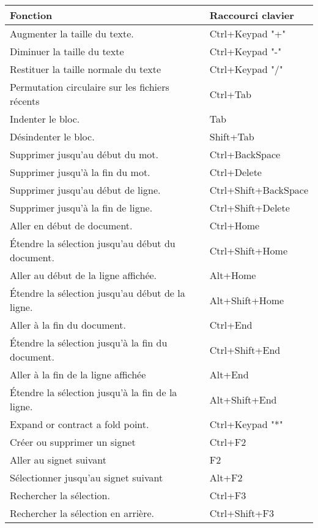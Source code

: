 \begin{tabular}{|l|l|}\hline
Fonction		                        &	Raccourci clavier\\ \hline
Augmenter la taille du texte. 	        &   Ctrl+Keypad "+"\\ \hline
Diminuer la taille du texte             &   Ctrl+Keypad "-"\\ \hline
Restituer la taille normale du texte    &   Ctrl+Keypad "/"\\ \hline
Permutation circulaire sur les fichiers récents&   Ctrl+Tab\\ \hline
Indenter le bloc. 	                    &   Tab\\ \hline
Désindenter le bloc.                    &   Shift+Tab\\ \hline
Supprimer jusqu'au début du mot.        &   Ctrl+BackSpace\\ \hline
Supprimer jusqu'à la fin du mot.        &   Ctrl+Delete\\ \hline
Supprimer jusqu'au début de ligne.      &   Ctrl+Shift+BackSpace\\ \hline
Supprimer jusqu'à la fin de ligne.      &   Ctrl+Shift+Delete\\ \hline
Aller en début de document. 	        &   Ctrl+Home\\ \hline
Étendre la sélection jusqu'au début du document. 	&   Ctrl+Shift+Home\\ \hline
Aller au début de la ligne affichée.    &   Alt+Home\\ \hline
Étendre la sélection jusqu'au début de la ligne. 	&   Alt+Shift+Home\\ \hline
Aller à la fin du document. 	        &   Ctrl+End\\ \hline
Étendre la sélection jusqu'à la fin du document. 	&   Ctrl+Shift+End\\ \hline
Aller à la fin de la ligne affichée     &   Alt+End\\ \hline
Étendre la sélection jusqu'à la fin de la ligne.&   Alt+Shift+End\\ \hline
Expand or contract a fold point. 	    &   Ctrl+Keypad "*"\\ \hline
Créer ou supprimer un signet	        &	Ctrl+F2\\ \hline
Aller au signet suivant		            &	F2\\ \hline
Sélectionner jusqu'au signet suivant    &	Alt+F2\\ \hline
Rechercher la sélection.			    & 	Ctrl+F3\\ \hline
Rechercher la sélection en arrière.     &	Ctrl+Shift+F3\\ \hline

\end{tabular}
